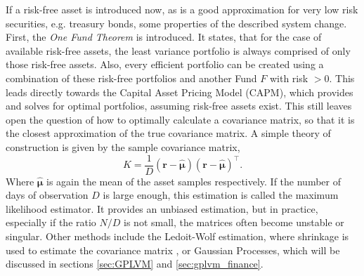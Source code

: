 If a risk-free asset is introduced now, as is a good approximation for very low risk securities, e.g. treasury bonds, some properties of the described system change. First, the \textit{One Fund Theorem} is introduced. It states, that for the case of available risk-free assets, the least variance portfolio is always comprised of only those risk-free assets. Also, every efficient portfolio can be created using a combination of these risk-free portfolios and another Fund $F$ with risk $>0$. This leads directly towards the Capital Asset Pricing Model (CAPM), which provides and solves for optimal portfolios, assuming risk-free assets exist. \newline 
This still leaves open the question of how to optimally calculate a covariance matrix, so that it is the closest approximation of the true covariance matrix. A simple theory of construction is given by the sample covariance matrix, 
\begin{equation}
	K = \frac{1}{D} (\bm{r}-\bm{\hat{\mu}})(\bm{r}-\bm{\hat{\mu}})^{\top}.
	\label{eq:sample_cov}
\end{equation}
Where $\bm{\hat{\mu}}$ is again the mean of the asset samples respectively. If the number of days of observation $D$ is large enough, this estimation is called the maximum likelihood estimator. It provides an unbiased estimation, but in practice, especially if the ratio $N/D$ is not small, the matrices often become unstable or singular. Other methods include the Ledoit-Wolf estimation, where shrinkage is used to estimate the covariance matrix \cite{Ledoit_2004}, or Gaussian Processes, which will be discussed in sections \ref{sec:GPLVM} and \ref{sec:gplvm_finance}. 